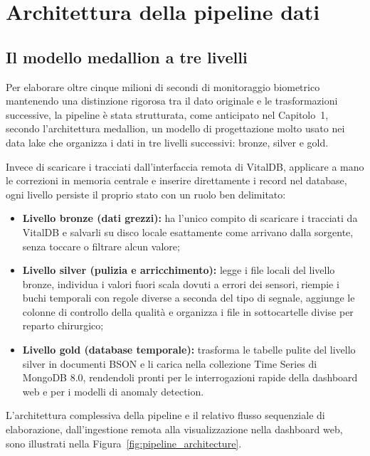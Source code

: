 \chapter{Architettura della pipeline dati}

\section{Il modello medallion a tre livelli}
Per elaborare oltre cinque milioni di secondi di monitoraggio biometrico mantenendo una distinzione rigorosa tra il dato originale e le trasformazioni successive, la pipeline \`e stata strutturata, come anticipato nel Capitolo~1, secondo l'architettura medallion, un modello di progettazione molto usato nei data lake che organizza i dati in tre livelli successivi: bronze, silver e gold.

Invece di scaricare i tracciati dall'interfaccia remota di VitalDB, applicare a mano le correzioni in memoria centrale e inserire direttamente i record nel database, ogni livello persiste il proprio stato con un ruolo ben delimitato:
 \begin{itemize}
    \item \textbf{Livello bronze (dati grezzi):} ha l'unico compito di scaricare i tracciati da VitalDB e salvarli su disco locale esattamente come arrivano dalla sorgente, senza toccare o filtrare alcun valore;    \item \textbf{Livello silver (pulizia e arricchimento):} legge i file locali del livello bronze, individua i valori fuori scala dovuti a errori dei sensori, riempie i buchi temporali con regole diverse a seconda del tipo di segnale, aggiunge le colonne di controllo della qualit\`a e organizza i file in sottocartelle divise per reparto chirurgico;    \item \textbf{Livello gold (database temporale):} trasforma le tabelle pulite del livello silver in documenti BSON e li carica nella collezione Time Series di MongoDB 8.0, rendendoli pronti per le interrogazioni rapide della dashboard web e per i modelli di anomaly detection.\end{itemize}
L'architettura complessiva della pipeline e il relativo flusso sequenziale di elaborazione, dall'ingestione remota alla visualizzazione nella dashboard web, sono illustrati nella Figura~\ref{fig:pipeline_architecture}.

